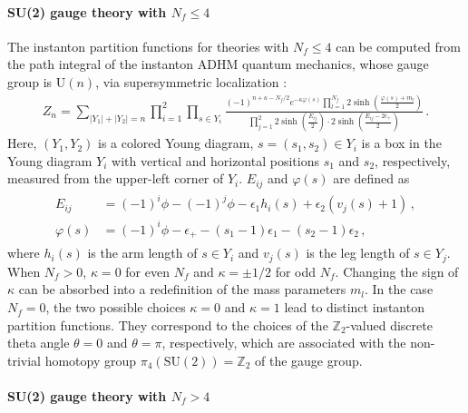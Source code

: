 \documentclass[11pt, a4paper]{article}
\theoremstyle{definition}
\begin{document}
\paragraph{SU(2) gauge theory with $ N_f \leq 4 $}

The instanton partition functions for theories with $ N_f \leq 4 $ can be computed from the path integral of the instanton ADHM quantum mechanics, whose gauge group is $ \mathrm{U}(n) $, via supersymmetric localization \cite{Hwang:2014uwa}:
\begin{align}\label{eq:su2-adhm}
    Z_n = \sum_{|Y_1|+|Y_2|=n} \prod_{i=1}^2 \prod_{s\in Y_i} \frac{(-1)^{n+\kappa-N_f/2} e^{-\kappa \varphi(s)} \prod_{l=1}^{N_f} 2\sinh(\frac{\varphi(s)+m_l}{2})}{\prod_{j=1}^2 2\sinh(\frac{E_{ij}}{2}) \cdot 2\sinh(\frac{E_{ij}-2\epsilon_+}{2})} \, .
\end{align}
Here, $ (Y_1,Y_2) $ is a colored Young diagram, $ s=(s_1,s_2) \in Y_i $ is a box in the Young diagram $ Y_i $ with vertical and horizontal positions $ s_1 $ and $ s_2 $, respectively, measured from the upper-left corner of $ Y_i $. $ E_{ij} $ and $ \varphi(s) $ are defined as
\begin{align}
    \begin{aligned}
        E_{ij} &= (-1)^i \phi - (-1)^j \phi - \epsilon_1 h_i(s) + \epsilon_2(v_j(s)+1) \, , \\
        \varphi(s) &= (-1)^i \phi - \epsilon_+ - (s_1-1)\epsilon_1 - (s_2-1)\epsilon_2 \, ,
    \end{aligned}
\end{align}
where $ h_i(s) $ is the arm length of $ s\in Y_i $ and $ v_j(s) $ is the leg length of $ s \in Y_j $. When $ N_f>0 $, $ \kappa=0 $ for even $ N_f $ and $ \kappa=\pm 1/2 $ for odd $ N_f $. Changing the sign of $ \kappa $ can be absorbed into a redefinition of the mass parameters $ m_l $. In the case $ N_f=0 $, the two possible choices $ \kappa=0 $ and $ \kappa=1 $ lead to distinct instanton partition functions. They correspond to the choices of the $ \mathbb{Z}_2 $-valued discrete theta angle $ \theta=0 $ and $ \theta=\pi $, respectively, which are associated with the non-trivial homotopy group $ \pi_4(\mathrm{SU}(2)) = \mathbb{Z}_2 $ of the gauge group.


\paragraph{SU(2) gauge theory with $ N_f > 4 $}
\end{document}
